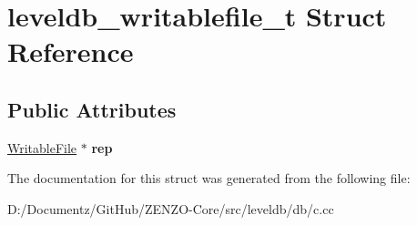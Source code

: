 \hypertarget{structleveldb__writablefile__t}{}\section{leveldb\+\_\+writablefile\+\_\+t Struct Reference}
\label{structleveldb__writablefile__t}
\subsection*{Public Attributes}
\begin{DoxyCompactItemize}
\item 
\mbox{\label{structleveldb__writablefile__t_a3cf7e2a9ac0560d667deee9d574d7761}} 
\mbox{\hyperlink{classleveldb_1_1_writable_file}{Writable\+File}} $\ast$ {\bfseries rep}
\end{DoxyCompactItemize}


The documentation for this struct was generated from the following file\+:\begin{DoxyCompactItemize}
\item 
D\+:/\+Documentz/\+Git\+Hub/\+Z\+E\+N\+Z\+O-\/\+Core/src/leveldb/db/c.\+cc\end{DoxyCompactItemize}
